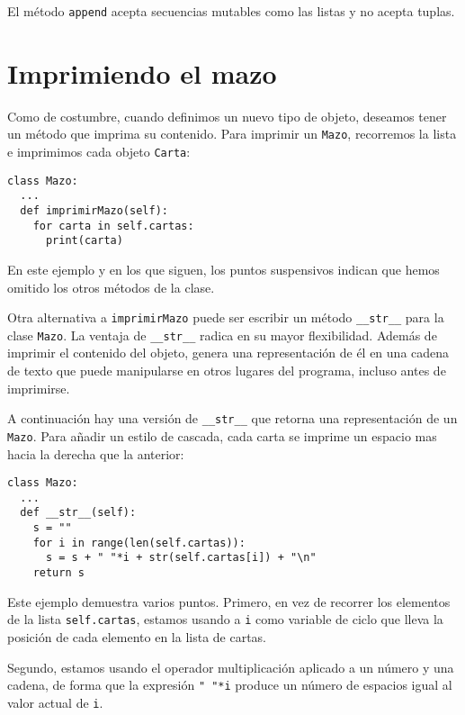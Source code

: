 El método \texttt{append} acepta secuencias mutables como las listas
y no acepta tuplas.

  

\section{Imprimiendo el mazo}

\label{printdeck} 

Como de costumbre, cuando definimos un nuevo tipo de objeto, deseamos
tener un método que imprima su contenido. Para imprimir un \texttt{Mazo},
recorremos la lista e imprimimos cada objeto \texttt{Carta}:
\begin{lstlisting}
class Mazo:
  ...
  def imprimirMazo(self):
    for carta in self.cartas:
      print(carta)
\end{lstlisting}
En este ejemplo y en los que siguen, los puntos suspensivos indican
que hemos omitido los otros métodos de la clase.

Otra alternativa a \texttt{imprimirMazo} puede ser escribir un método
\texttt{\_\_str\_\_} para la clase \texttt{Mazo}. La ventaja de \texttt{\_\_str\_\_}
radica en su mayor flexibilidad. Además de imprimir el contenido del
objeto, genera una representación de él en una cadena de texto que
puede manipularse en otros lugares del programa, incluso antes de
imprimirse.

A continuación hay una versión de \texttt{\_\_str\_\_} que retorna
una representación de un \texttt{Mazo}. Para añadir un estilo de cascada,
cada carta se imprime un espacio mas hacia la derecha que la anterior:
\begin{lstlisting}
class Mazo:
  ...
  def __str__(self):
    s = ""
    for i in range(len(self.cartas)):
      s = s + " "*i + str(self.cartas[i]) + "\n"
    return s
\end{lstlisting}
Este ejemplo demuestra varios puntos. Primero, en vez de recorrer
los elementos de la lista \texttt{self.cartas}, estamos usando a \texttt{i}
como variable de ciclo que lleva la posición de cada elemento en la
lista de cartas.

Segundo, estamos usando el operador multiplicación aplicado a un número
y una cadena, de forma que la expresión \verb+" "*i+ produce un número
de espacios igual al valor actual de \texttt{i}.

